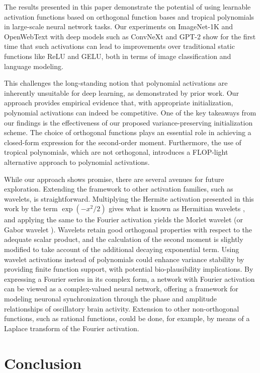 \documentclass{article} %
\theoremstyle{plain}
\theoremstyle{definition}
\theoremstyle{remark}
\begin{document}
The results presented in this paper demonstrate the potential of using learnable activation functions based on orthogonal function bases and tropical polynomials in large-scale neural network tasks. Our experiments on ImageNet-1K and OpenWebText with deep models such as ConvNeXt and GPT-2 show for the first time that such activations can lead to improvements over traditional static functions like ReLU and GELU, both in terms of image classification and language modeling. 

This challenges the long-standing notion that polynomial activations are inherently unsuitable for deep learning, as demonstrated by prior work. Our approach provides empirical evidence that, with appropriate initialization, polynomial activations can indeed be competitive. One of the key takeaways from our findings is the effectiveness of our proposed variance-preserving initialization scheme. The choice of orthogonal functions plays an essential role in achieving a closed-form expression for the second-order moment. Furthermore, the use of tropical polynomials, which are not orthogonal, introduces a FLOP-light alternative approach to polynomial activations.

While our approach shows promise, there are several avenues for future exploration. Extending the framework to other activation families, such as wavelets, is straightforward.  Multiplying the Hermite activation presented in this work  by the term $\exp{(-x^2/2)}$ gives what is known as Hermitian wavelets \cite{brackx2008hermitian}, and applying the same to the Fourier activation yields the Morlet wavelet \cite{grossmann1984decomposition} (or Gabor wavelet \cite{gabor1946theory}). Wavelets retain good orthogonal properties with respect to the adequate scalar product, and the calculation of the second moment is slightly modified to take account of the additional decaying exponential term.
Using wavelet activations instead of polynomials could enhance variance stability by providing finite function support, with potential bio-plausibility implications. By expressing a Fourier series in its complex form, a network with Fourier activation can be viewed as a complex-valued neural network, offering a framework for modeling neuronal synchronization through the phase and amplitude relationships of oscillatory brain activity. Extension to other non-orthogonal functions, such as rational functions, could be done, for example, by means of a Laplace transform of the Fourier activation.

\section{Conclusion}
\end{document}
